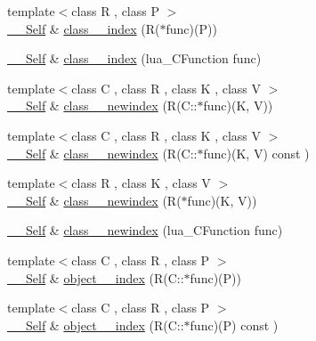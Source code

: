 \begin{DoxyCompactItemize}
\item 
{\footnotesize template$<$class R , class P $>$ }\\\hyperlink{classSLB_1_1Class_aef6fc94f5e50c96268e669ab6946ad8b}{\+\_\+\+\_\+\+Self} \& \hyperlink{classSLB_1_1Class_a69d6492c044c23f6392c0cc5b1029726}{class\+\_\+\+\_\+index} (R($\ast$func)(P))
\item 
\hyperlink{classSLB_1_1Class_aef6fc94f5e50c96268e669ab6946ad8b}{\+\_\+\+\_\+\+Self} \& \hyperlink{classSLB_1_1Class_a7832865a7909a0c46d75939955ad2062}{class\+\_\+\+\_\+index} (lua\+\_\+\+C\+Function func)
\item 
{\footnotesize template$<$class C , class R , class K , class V $>$ }\\\hyperlink{classSLB_1_1Class_aef6fc94f5e50c96268e669ab6946ad8b}{\+\_\+\+\_\+\+Self} \& \hyperlink{classSLB_1_1Class_a0911a2857ca63b7bcbcdbddbf0510365}{class\+\_\+\+\_\+newindex} (R(C\+::$\ast$func)(K, V))
\item 
{\footnotesize template$<$class C , class R , class K , class V $>$ }\\\hyperlink{classSLB_1_1Class_aef6fc94f5e50c96268e669ab6946ad8b}{\+\_\+\+\_\+\+Self} \& \hyperlink{classSLB_1_1Class_a9cbfa8c392023f44cdca7f9e0ed81eec}{class\+\_\+\+\_\+newindex} (R(C\+::$\ast$func)(K, V) const )
\item 
{\footnotesize template$<$class R , class K , class V $>$ }\\\hyperlink{classSLB_1_1Class_aef6fc94f5e50c96268e669ab6946ad8b}{\+\_\+\+\_\+\+Self} \& \hyperlink{classSLB_1_1Class_a30339ccdeecf6c6e65f57b73e623ff37}{class\+\_\+\+\_\+newindex} (R($\ast$func)(K, V))
\item 
\hyperlink{classSLB_1_1Class_aef6fc94f5e50c96268e669ab6946ad8b}{\+\_\+\+\_\+\+Self} \& \hyperlink{classSLB_1_1Class_a2bcdc34f048f9fcf6a19bf6f78f320c7}{class\+\_\+\+\_\+newindex} (lua\+\_\+\+C\+Function func)
\item 
{\footnotesize template$<$class C , class R , class P $>$ }\\\hyperlink{classSLB_1_1Class_aef6fc94f5e50c96268e669ab6946ad8b}{\+\_\+\+\_\+\+Self} \& \hyperlink{classSLB_1_1Class_a498c6e1f00bba874e44e150e4669c0fe}{object\+\_\+\+\_\+index} (R(C\+::$\ast$func)(P))
\item 
{\footnotesize template$<$class C , class R , class P $>$ }\\\hyperlink{classSLB_1_1Class_aef6fc94f5e50c96268e669ab6946ad8b}{\+\_\+\+\_\+\+Self} \& \hyperlink{classSLB_1_1Class_a04906be0fd1c49d6836960869e53d2c1}{object\+\_\+\+\_\+index} (R(C\+::$\ast$func)(P) const )

\end{DoxyCompactItemize}
